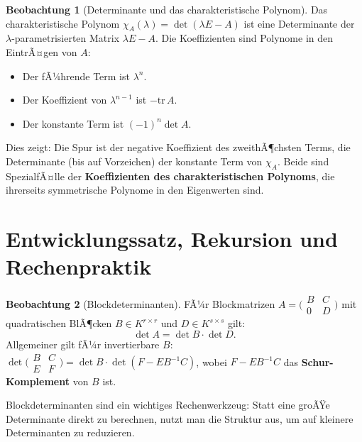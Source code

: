 ﻿\documentclass[a4paper,12pt]{report}
\theoremstyle{definition}
\newtheorem{beobachtung}{Beobachtung}
\begin{document}
\begin{beobachtung}[Determinante und das charakteristische Polynom]
    Das charakteristische Polynom $\chi_A(\lambda) = \det(\lambda E - A)$
    ist eine Determinante der $\lambda$-parametrisierten Matrix
    $\lambda E - A$. Die Koeffizienten sind Polynome in den
    EintrÃ¤gen von $A$:
    \begin{itemize}
        \item[-] Der fÃ¼hrende Term ist $\lambda^n$.
        \item[-] Der Koeffizient von $\lambda^{n-1}$ ist $-\mathrm{tr}\,A$.
        \item[-] Der konstante Term ist $(-1)^n \det A$.
    \end{itemize}
    Dies zeigt: Die Spur ist der negative Koeffizient des zweithÃ¶chsten
    Terms, die Determinante (bis auf Vorzeichen) der konstante Term von
    $\chi_A$. Beide sind SpezialfÃ¤lle der \textbf{Koeffizienten
    des charakteristischen Polynoms}, die ihrerseits symmetrische
    Polynome in den Eigenwerten sind.
\end{beobachtung}


\section{Entwicklungssatz, Rekursion und Rechenpraktik}

\begin{beobachtung}[Blockdeterminanten]
    FÃ¼r Blockmatrizen $A = \bigl(\begin{smallmatrix} B & C \\ 0 & D \end{smallmatrix}\bigr)$
    mit quadratischen BlÃ¶cken $B \in K^{r \times r}$ und $D \in K^{s \times s}$ gilt:
    \[
        \det A = \det B \cdot \det D.
    \]
    Allgemeiner gilt fÃ¼r invertierbare $B$:
    $\det\bigl(\begin{smallmatrix}B & C \\ E & F\end{smallmatrix}\bigr)
    = \det B \cdot \det(F - EB^{-1}C)$, wobei $F - EB^{-1}C$ das
    \textbf{Schur-Komplement} von $B$ ist.

    Blockdeterminanten sind ein wichtiges Rechenwerkzeug: Statt eine
    groÃŸe Determinante direkt zu berechnen, nutzt man die Struktur
    aus, um auf kleinere Determinanten zu reduzieren.
\end{beobachtung}
\end{document}
